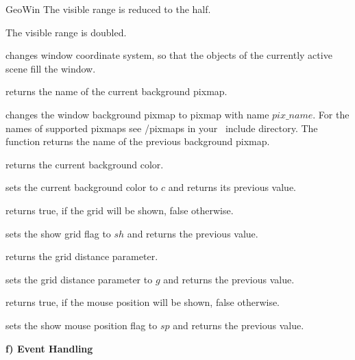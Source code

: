 \begin{ccRefClass}{GeoWin}
{The visible range is reduced to the half. }

{The visible range is doubled. }

{changes window coordinate system, so that the objects of the 
currently active scene fill the window. }

\begin{ccAdvanced}
{returns the name of the current background pixmap.}
  	    
{changes the window background pixmap to pixmap with name $pix\_name$.
For the names of supported pixmaps see /pixmaps in your \leda\ include
directory.
The function returns the name of the previous background pixmap.}
\end{ccAdvanced}


{returns the current background color.}
  	    
{sets the current background color to $c$ and returns its previous value.}	 

{returns true, if the grid will be shown, false otherwise.}
  
{sets the show grid flag to $sh$ and returns the previous value.}
  
{returns the grid distance parameter.}
  
{sets the grid distance parameter to $g$ and returns the previous value.}
  
{returns true, if the mouse position will be shown, false otherwise.}
  
{sets the show mouse position flag to $sp$ and returns the previous value.} 

\begin{ccAdvanced}
\medskip
{\bf f) Event Handling} 


\end{ccAdvanced}
\end{ccRefClass}
